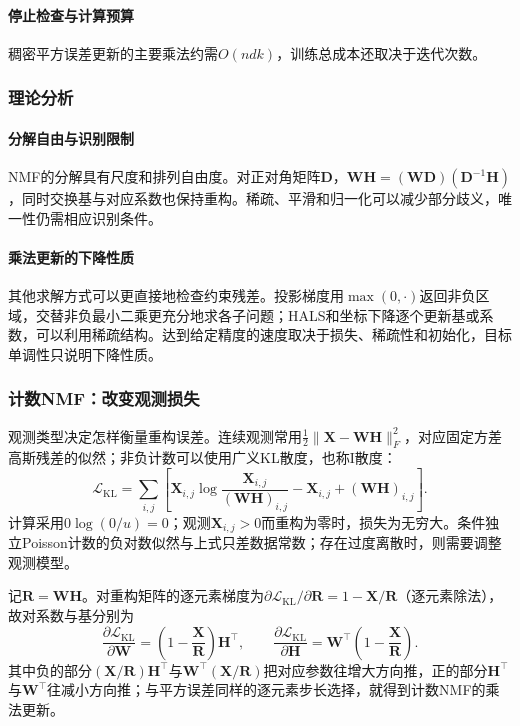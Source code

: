 \paragraph{停止检查与计算预算}

稠密平方误差更新的主要乘法约需$O(ndk)$，训练总成本还取决于迭代次数。

\subsubsection{理论分析}

\paragraph{分解自由与识别限制}

NMF的分解具有尺度和排列自由度。对正对角矩阵$\bm{D}$，$\bm{W}\bm{H}=(\bm{W}\bm{D})(\bm{D}^{-1}\bm{H})$，同时交换基与对应系数也保持重构。稀疏、平滑和归一化可以减少部分歧义，唯一性仍需相应识别条件。

\paragraph{乘法更新的下降性质}

其他求解方式可以更直接地检查约束残差。投影梯度用$\max(0,\cdot)$返回非负区域，交替非负最小二乘更充分地求各子问题；HALS和坐标下降逐个更新基或系数，可以利用稀疏结构。达到给定精度的速度取决于损失、稀疏性和初始化，目标单调性只说明下降性质。

\subsubsection{计数NMF：改变观测损失}

观测类型决定怎样衡量重构误差。连续观测常用$\frac12\lVert\bm{X}-\bm{W}\bm{H}\rVert_F^2$，对应固定方差高斯残差的似然；非负计数可以使用广义KL散度，也称I散度：
\begin{equation}
  \mathcal{L}_{\mathrm{KL}}
  =\sum_{i,j}\left[
      \bm{X}_{i,j}\log\frac{\bm{X}_{i,j}}{(\bm{W}\bm{H})_{i,j}}
      -\bm{X}_{i,j}+(\bm{W}\bm{H})_{i,j}\right].
  \label{eq:dim-nmf-kl}
\end{equation}
计算采用$0\log(0/u)=0$；观测$\bm{X}_{i,j}>0$而重构为零时，损失为无穷大。条件独立Poisson计数的负对数似然与上式只差数据常数；存在过度离散时，则需要调整观测模型。

记$\bm R=\bm W\bm H$。对重构矩阵的逐元素梯度为$\partial\mathcal L_{\mathrm{KL}}/\partial\bm R=1-\bm X/\bm R$（逐元素除法），故对系数与基分别为
\[
\frac{\partial\mathcal L_{\mathrm{KL}}}{\partial\bm W}
=\left(1-\frac{\bm X}{\bm R}\right)\bm H^\top,\qquad
\frac{\partial\mathcal L_{\mathrm{KL}}}{\partial\bm H}
=\bm W^\top\left(1-\frac{\bm X}{\bm R}\right).
\]
其中负的部分$(\bm X/\bm R)\bm H^\top$与$\bm W^\top(\bm X/\bm R)$把对应参数往增大方向推，正的部分$\bm H^\top$与$\bm W^\top$往减小方向推；与平方误差同样的逐元素步长选择，就得到计数NMF的乘法更新。

